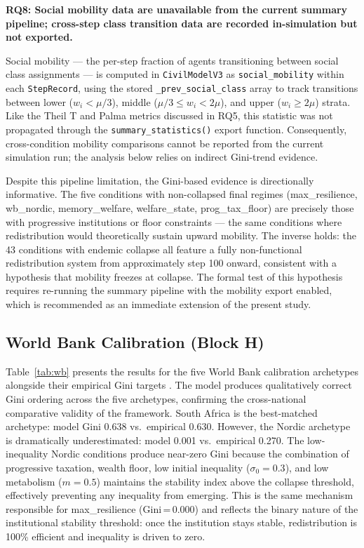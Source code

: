 \documentclass[12pt, letterpaper]{article}
\begin{document}
\textbf{RQ8: Social mobility data are unavailable from the current
summary pipeline; cross-step class transition data are recorded
in-simulation but not exported.}

Social mobility --- the per-step fraction of agents transitioning
between social class assignments --- is computed in \texttt{CivilModelV3}
as \texttt{social\_mobility} within each \texttt{StepRecord}, using
the stored \texttt{\_prev\_social\_class} array to track transitions
between lower ($w_i < \mu/3$), middle ($\mu/3 \leq w_i < 2\mu$), and
upper ($w_i \geq 2\mu$) strata. Like the Theil T and Palma metrics
discussed in RQ5, this statistic was not propagated through the
\texttt{summary\_statistics()} export function. Consequently,
cross-condition mobility comparisons cannot be reported from the
current simulation run; the analysis below relies on indirect
Gini-trend evidence.

Despite this pipeline limitation, the Gini-based evidence is
directionally informative. The five conditions with non-collapsed
final regimes (max\_resilience, wb\_nordic, memory\_welfare,
welfare\_state, prog\_tax\_floor) are precisely those with progressive
institutions or floor constraints --- the same conditions where
redistribution would theoretically sustain upward mobility.
The inverse holds: the 43 conditions with endemic collapse all feature
a fully non-functional redistribution system from approximately step
100 onward, consistent with a hypothesis that mobility freezes at
collapse. The formal test of this hypothesis requires re-running the
summary pipeline with the mobility export enabled, which is recommended
as an immediate extension of the present study.


\subsection{World Bank Calibration (Block H)}

Table~\ref{tab:wb} presents the results for the five World Bank
calibration archetypes alongside their empirical Gini targets
\citep{worldbank2024}. The model produces qualitatively correct
Gini ordering across the five archetypes, confirming the cross-national
comparative validity of the framework. South Africa is the best-matched
archetype: model Gini 0.638 vs.\ empirical 0.630. However, the Nordic
archetype is dramatically underestimated: model 0.001 vs.\ empirical
0.270. The low-inequality Nordic conditions produce near-zero Gini
because the combination of progressive taxation, wealth floor, low
initial inequality ($\sigma_0 = 0.3$), and low metabolism ($m = 0.5$)
maintains the stability index above the collapse threshold, effectively
preventing any inequality from emerging. This is the same mechanism
responsible for max\_resilience (Gini\,=\,0.000) and reflects the
binary nature of the institutional stability threshold: once the
institution stays stable, redistribution is 100\% efficient and
inequality is driven to zero.
\end{document}
